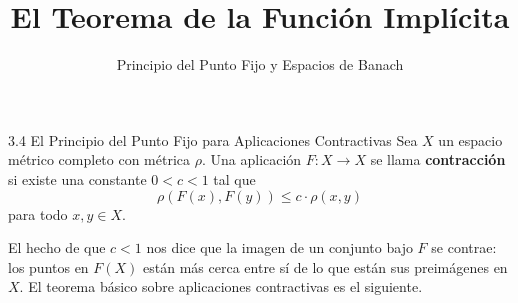 \documentclass[10pt]{beamer}
\title{El Teorema de la Función Implícita}
\subtitle{Principio del Punto Fijo y Espacios de Banach}
\author{}
\date{}
\begin{document}
	
	\begin{frame}
		\titlepage
	\end{frame}
	
	\begin{frame}{3.4 El Principio del Punto Fijo para Aplicaciones Contractivas}
		Sea $X$ un espacio métrico completo con métrica $\rho$. Una aplicación $F : X \to X$ se llama \textbf{contracción} si existe una constante $0 < c < 1$ tal que
		\[ \rho(F(x), F(y)) \leq c \cdot \rho(x, y) \]
		para todo $x, y \in X$. 
		
		El hecho de que $c < 1$ nos dice que la imagen de un conjunto bajo $F$ se contrae: los puntos en $F(X)$ están más cerca entre sí de lo que están sus preimágenes en $X$. El teorema básico sobre aplicaciones contractivas es el siguiente.
	\end{frame}
	
\end{document}
